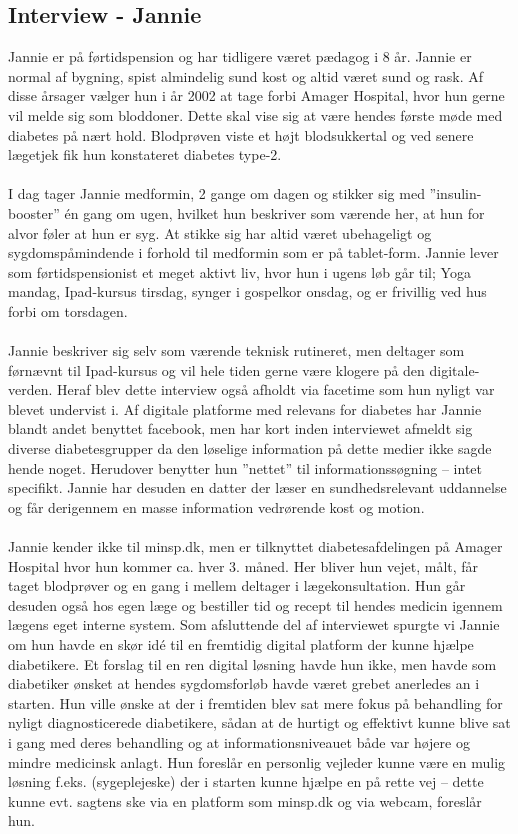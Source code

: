 \subsection{Interview - Jannie}
Jannie er på førtidspension og har tidligere været pædagog i 8 år. Jannie er normal af bygning, spist almindelig sund kost og altid været sund og rask. Af disse årsager vælger hun i år 2002 at tage forbi Amager Hospital, hvor hun gerne vil melde sig som bloddoner. Dette skal vise sig at være hendes første møde med diabetes på nært hold. Blodprøven viste et højt blodsukkertal og ved senere lægetjek fik hun konstateret diabetes type-2.
\\ \\
I dag tager Jannie medformin, 2 gange om dagen og stikker sig med ”insulin-booster” én gang om ugen, hvilket hun beskriver som værende her, at hun for alvor føler at hun er syg. At stikke sig har altid været ubehageligt og sygdomspåmindende i forhold til medformin som er på tablet-form. Jannie lever som førtidspensionist et meget aktivt liv, hvor hun i ugens løb går til; Yoga mandag, Ipad-kursus tirsdag, synger i gospelkor onsdag, og er frivillig ved hus forbi om torsdagen.
\\ \\
Jannie beskriver sig selv som værende teknisk rutineret, men deltager som førnævnt til Ipad-kursus og vil hele tiden gerne være klogere på den digitale-verden. Heraf blev dette interview også afholdt via facetime som hun nyligt var blevet undervist i. Af digitale platforme med relevans for diabetes har Jannie blandt andet benyttet facebook, men har kort inden interviewet afmeldt sig diverse diabetesgrupper da den løselige information på dette medier ikke sagde hende noget. Herudover benytter hun ”nettet” til informationssøgning – intet specifikt. Jannie har desuden en datter der læser en sundhedsrelevant uddannelse og får derigennem en masse information vedrørende kost og motion.
\\ \\
Jannie kender ikke til minsp.dk, men er tilknyttet diabetesafdelingen på Amager Hospital hvor hun kommer ca. hver 3. måned. Her bliver hun vejet, målt, får taget blodprøver og en gang i mellem deltager i lægekonsultation. Hun går desuden også hos egen læge og bestiller tid og recept til hendes medicin igennem lægens eget interne system.
Som afsluttende del af interviewet spurgte vi Jannie om hun havde en skør idé til en fremtidig digital platform der kunne hjælpe diabetikere. Et forslag til en ren digital løsning havde hun ikke, men havde som diabetiker ønsket at hendes sygdomsforløb havde været grebet anerledes an i starten. Hun ville ønske at der i fremtiden blev sat mere fokus på behandling for nyligt diagnosticerede diabetikere, sådan at de hurtigt og effektivt kunne blive sat i gang med deres behandling og at informationsniveauet både var højere og mindre medicinsk anlagt. Hun foreslår en personlig vejleder kunne være en mulig løsning f.eks. (sygeplejeske) der i starten kunne hjælpe en på rette vej – dette kunne evt. sagtens ske via en platform som minsp.dk og via webcam, foreslår hun.

